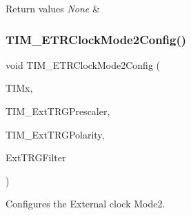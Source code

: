 \begin{DoxyRetVals}{Return values}
{\em None} & \\
\hline
\end{DoxyRetVals}
\mbox{\label{group___t_i_m___private___functions_ga0a9cbcbab32326cbbdaf4c111f59ec20}} 
\subsubsection{\texorpdfstring{TIM\_ETRClockMode2Config()}{TIM\_ETRClockMode2Config()}}
{\footnotesize\ttfamily void T\+I\+M\+\_\+\+E\+T\+R\+Clock\+Mode2\+Config (\begin{DoxyParamCaption}\item[{\mbox{\hyperlink{struct_t_i_m___type_def}{T\+I\+M\+\_\+\+Type\+Def}} $\ast$}]{T\+I\+Mx,  }\item[{uint16\+\_\+t}]{T\+I\+M\+\_\+\+Ext\+T\+R\+G\+Prescaler,  }\item[{uint16\+\_\+t}]{T\+I\+M\+\_\+\+Ext\+T\+R\+G\+Polarity,  }\item[{uint16\+\_\+t}]{Ext\+T\+R\+G\+Filter }\end{DoxyParamCaption})}



Configures the External clock Mode2. 


